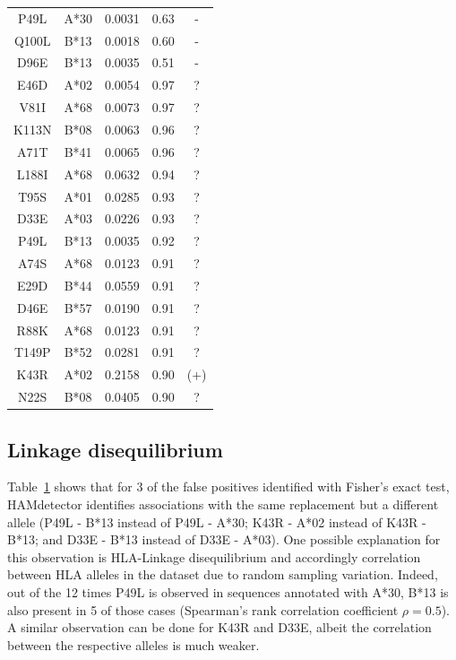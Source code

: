 \documentclass{bioinfo}
\begin{document}
\begin{table}
\begin{tabular}{c|c|c|c|c}
  P49L        & A*30 & 0.0031                        & 0.63                                & -                        \\
  Q100L       & B*13 & 0.0018                        & 0.60                                & -                        \\
  D96E        & B*13 & 0.0035                        & 0.51                                & -  \\\hline
  E46D & A*02 & 0.0054 & 0.97 & ? \\
  V81I & A*68 & 0.0073 & 0.97 & ? \\
  K113N & B*08 & 0.0063 & 0.96 & ? \\
  A71T & B*41 & 0.0065 & 0.96 & ? \\
  L188I & A*68 & 0.0632 & 0.94 & ? \\
  T95S & A*01 & 0.0285 & 0.93 & ? \\
  D33E & A*03 & 0.0226 & 0.93 & ? \\
  P49L & B*13 & 0.0035 & 0.92 & ? \\
  A74S & A*68 & 0.0123 & 0.91 & ? \\
  E29D & B*44 & 0.0559 & 0.91 & ? \\
  D46E & B*57 & 0.0190 & 0.91 & ? \\
  R88K & A*68 & 0.0123 & 0.91 & ? \\
  T149P & B*52 & 0.0281 & 0.91 & ? \\
  K43R & A*02 & 0.2158 & 0.90 & (+) \\
  N22S & B*08 & 0.0405 & 0.90 & ? \\
  \end{tabular}
  \label{tab:false-positives}
 \end{table}

 \subsection{Linkage disequilibrium}

 Table~\ref{tab:false-positives} shows that for 3 of the false positives identified with Fisher's exact test, HAMdetector identifies associations with the same replacement but a different allele (P49L - B*13 instead of P49L - A*30; K43R - A*02 instead of K43R - B*13; and D33E - B*13 instead of D33E - A*03).
 One possible explanation for this observation is HLA-Linkage disequilibrium and accordingly correlation between HLA alleles in the dataset due to random sampling variation.
Indeed, out of the 12 times P49L is observed in sequences annotated with A*30, B*13 is also present in 5 of those cases (Spearman's rank correlation coefficient \(\rho = 0.5\)). A similar observation can be done for K43R and D33E, albeit the correlation between the respective alleles is much weaker.
\end{document}
